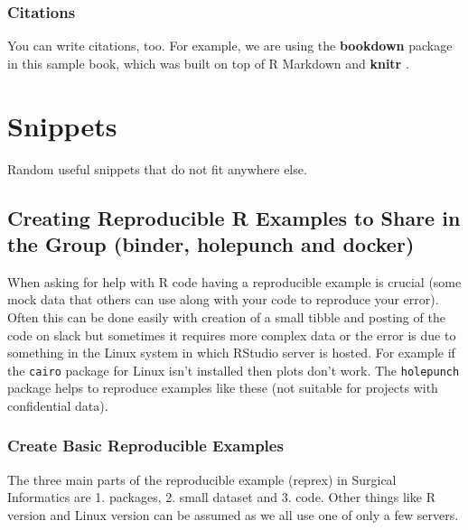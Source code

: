 \documentclass[]{book}
\begin{document}
\hypertarget{citations}{%
\subsection{Citations}\label{citations}}

You can write citations, too. For example, we are using the \textbf{bookdown} package \citep{R-bookdown} in this sample book, which was built on top of R Markdown and \textbf{knitr} \citep{xie2015}.

\hypertarget{snippets}{%
\chapter{Snippets}\label{snippets}}

Random useful snippets that do not fit anywhere else.

\hypertarget{creating-reproducible-r-examples-to-share-in-the-group-binder-holepunch-and-docker}{%
\section{Creating Reproducible R Examples to Share in the Group (binder, holepunch and docker)}\label{creating-reproducible-r-examples-to-share-in-the-group-binder-holepunch-and-docker}}

When asking for help with R code having a reproducible example is crucial (some mock data that others can use along with your code to reproduce your error). Often this can be done easily with creation of a small tibble and posting of the code on slack but sometimes it requires more complex data or the error is due to something in the Linux system in which RStudio server is hosted. For example if the \texttt{cairo} package for Linux isn't installed then plots don't work. The \texttt{holepunch} package helps to reproduce examples like these (not suitable for projects with confidential data).

\hypertarget{create-basic-reproducible-examples}{%
\subsection{Create Basic Reproducible Examples}\label{create-basic-reproducible-examples}}

The three main parts of the reproducible example (reprex) in Surgical Informatics are 1. packages, 2. small dataset and 3. code. Other things like R version and Linux version can be assumed as we all use one of only a few servers.
\end{document}
